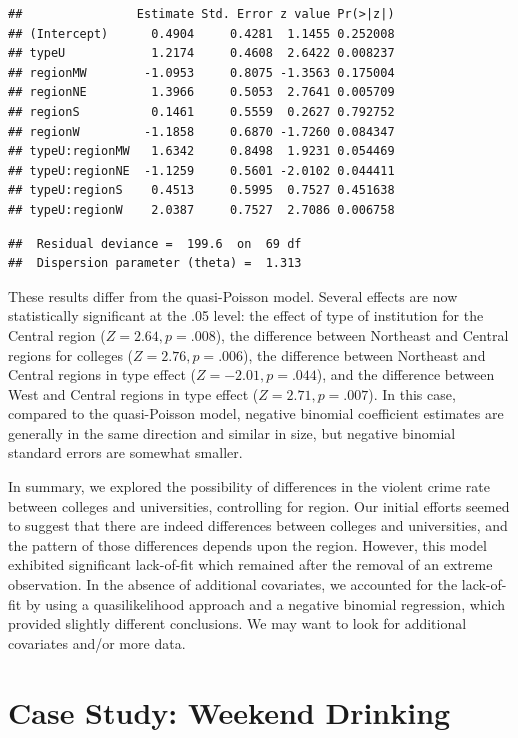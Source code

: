 \documentclass[
]{krantz}
\begin{document}
\begin{verbatim}
##                Estimate Std. Error z value Pr(>|z|)
## (Intercept)      0.4904     0.4281  1.1455 0.252008
## typeU            1.2174     0.4608  2.6422 0.008237
## regionMW        -1.0953     0.8075 -1.3563 0.175004
## regionNE         1.3966     0.5053  2.7641 0.005709
## regionS          0.1461     0.5559  0.2627 0.792752
## regionW         -1.1858     0.6870 -1.7260 0.084347
## typeU:regionMW   1.6342     0.8498  1.9231 0.054469
## typeU:regionNE  -1.1259     0.5601 -2.0102 0.044411
## typeU:regionS    0.4513     0.5995  0.7527 0.451638
## typeU:regionW    2.0387     0.7527  2.7086 0.006758
\end{verbatim}

\begin{verbatim}
##  Residual deviance =  199.6  on  69 df 
##  Dispersion parameter (theta) =  1.313
\end{verbatim}

These results differ from the quasi-Poisson model. Several effects are now statistically significant at the .05 level: the effect of type of institution for the Central region (\(Z=2.64, p=.008\)), the difference between Northeast and Central regions for colleges (\(Z=2.76, p=.006\)), the difference between Northeast and Central regions in type effect (\(Z=-2.01, p=.044\)), and the difference between West and Central regions in type effect (\(Z=2.71, p=.007\)). In this case, compared to the quasi-Poisson model, negative binomial coefficient estimates are generally in the same direction and similar in size, but negative binomial standard errors are somewhat smaller.

In summary, we explored the possibility of differences in the violent crime rate between colleges and universities, controlling for region. Our initial efforts seemed to suggest that there are indeed differences between colleges and universities, and the pattern of those differences depends upon the region. However, this model exhibited significant lack-of-fit which remained after the removal of an extreme observation. In the absence of additional covariates, we accounted for the lack-of-fit by using a quasilikelihood approach and a negative binomial regression, which provided slightly different conclusions. We may want to look for additional covariates and/or more data.

\section{Case Study: Weekend Drinking}\label{cs:drinking}
\end{document}
